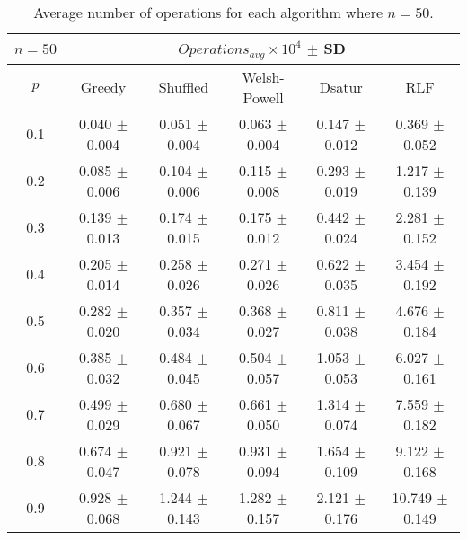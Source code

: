 \begin{table}[H]
    \centering
    \begin{tabular}{cccccc}
        
        $n = 50$& \multicolumn{5}{c}{$Operations_{avg}\times10^4$ $\pm$ SD} \\
        \hline
        $p$ & Greedy & Shuffled & Welsh-Powell & Dsatur & RLF \\
        \hline
        0.1 & 0.040 $\pm$ 0.004 & 0.051 $\pm$ 0.004 & 0.063 $\pm$ 0.004 & 0.147 $\pm$ 0.012 & 0.369 $\pm$ 0.052 \\
        0.2 & 0.085 $\pm$ 0.006 & 0.104 $\pm$ 0.006 & 0.115 $\pm$ 0.008 & 0.293 $\pm$ 0.019 & 1.217 $\pm$ 0.139 \\
        0.3 & 0.139 $\pm$ 0.013 & 0.174 $\pm$ 0.015 & 0.175 $\pm$ 0.012 & 0.442 $\pm$ 0.024 & 2.281 $\pm$ 0.152 \\
        0.4 & 0.205 $\pm$ 0.014 & 0.258 $\pm$ 0.026 & 0.271 $\pm$ 0.026 & 0.622 $\pm$ 0.035 & 3.454 $\pm$ 0.192 \\
        0.5 & 0.282 $\pm$ 0.020 & 0.357 $\pm$ 0.034 & 0.368 $\pm$ 0.027 & 0.811 $\pm$ 0.038 & 4.676 $\pm$ 0.184 \\
        0.6 & 0.385 $\pm$ 0.032 & 0.484 $\pm$ 0.045 & 0.504 $\pm$ 0.057 & 1.053 $\pm$ 0.053 & 6.027 $\pm$ 0.161 \\
        0.7 & 0.499 $\pm$ 0.029 & 0.680 $\pm$ 0.067 & 0.661 $\pm$ 0.050 & 1.314 $\pm$ 0.074 & 7.559 $\pm$ 0.182 \\
        0.8 & 0.674 $\pm$ 0.047 & 0.921 $\pm$ 0.078 & 0.931 $\pm$ 0.094 & 1.654 $\pm$ 0.109 & 9.122 $\pm$ 0.168 \\
        0.9 & 0.928 $\pm$ 0.068 & 1.244 $\pm$ 0.143 & 1.282 $\pm$ 0.157 & 2.121 $\pm$ 0.176 & 10.749 $\pm$ 0.149 \\
        \hline
    \end{tabular}
    \caption{Average number of operations for each algorithm where $n = 50$.}
    \label{tab:avgOpsforV50}
\end{table}

